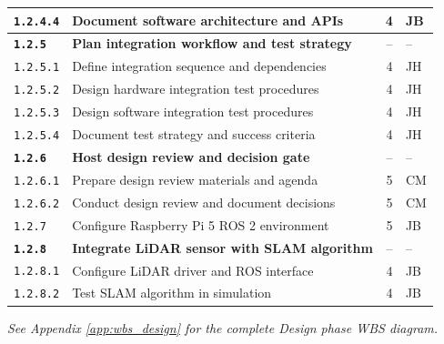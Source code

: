 \begin{longtable}{|l|p{6.5cm}|c|l|}
\hline
\rowcolor{white}
\texttt{1.2.4.4} & \quad Document software architecture and APIs & 4 & JB \\
\hline
\rowcolor{designyellow!35}
\texttt{\textbf{1.2.5}} & \textbf{Plan integration workflow and test strategy} & -- & -- \\
\hline
\rowcolor{designyellow!15}
\texttt{1.2.5.1} & \quad Define integration sequence and dependencies & 4 & JH \\
\hline
\rowcolor{white}
\texttt{1.2.5.2} & \quad Design hardware integration test procedures & 4 & JH \\
\hline
\rowcolor{designyellow!15}
\texttt{1.2.5.3} & \quad Design software integration test procedures & 4 & JH \\
\hline
\rowcolor{white}
\texttt{1.2.5.4} & \quad Document test strategy and success criteria & 4 & JH \\
\hline
\rowcolor{designyellow!35}
\texttt{\textbf{1.2.6}} & \textbf{Host design review and decision gate} & -- & -- \\
\hline
\rowcolor{designyellow!15}
\texttt{1.2.6.1} & \quad Prepare design review materials and agenda & 5 & CM \\
\hline
\rowcolor{white}
\texttt{1.2.6.2} & \quad Conduct design review and document decisions & 5 & CM \\
\hline
\rowcolor{designyellow!15}
\texttt{1.2.7} & Configure Raspberry Pi 5 ROS 2 environment & 5 & JB \\
\hline
\rowcolor{designyellow!35}
\texttt{\textbf{1.2.8}} & \textbf{Integrate LiDAR sensor with SLAM algorithm} & -- & -- \\
\hline
\rowcolor{white}
\texttt{1.2.8.1} & \quad Configure LiDAR driver and ROS interface & 4 & JB \\
\hline
\rowcolor{designyellow!15}
\texttt{1.2.8.2} & \quad Test SLAM algorithm in simulation & 4 & JB \\
\end{longtable}
\normalsize

\noindent\textit{See Appendix \ref{app:wbs_design} for the complete Design phase WBS diagram.}
